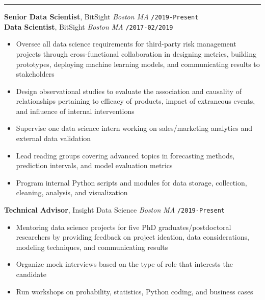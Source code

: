 \documentclass[10pt,english]{report}
\begin{document}
\vspace{5mm}

{\par}
\vspace{1mm}\hrule
\vspace{1mm}

\textbf{Senior Data Scientist}, BitSight \hfill \textit{Boston MA} \texttt{/2019-Present} \\
\textbf{Data Scientist}, BitSight \hfill \textit{Boston MA} \texttt{/2017-02/2019}
\begin{itemize}
\item Oversee all data science requirements for third-party risk management projects through cross-functional collaboration in designing metrics, building prototypes, deploying machine learning models, and communicating results to stakeholders
\item Design observational studies to evaluate the association and causality of relationships pertaining to efficacy of products, impact of extraneous events, and influence of internal interventions
\item Supervise one data science intern working on sales/marketing analytics and external data validation
\item Lead reading groups covering advanced topics in forecasting methods, prediction intervals, and model evaluation metrics
\item Program internal Python scripts and modules for data storage, collection, cleaning, analysis, and visualization
\end{itemize}

\vspace{1mm}

\textbf{Technical Advisor}, Insight Data Science \hfill \textit{Boston MA} \texttt{/2019-Present}
\begin{itemize}
\item Mentoring data science projects for five PhD graduates/postdoctoral researchers by providing feedback on project ideation, data considerations, modeling techniques, and communicating results
\item Organize mock interviews based on the type of role that interests the candidate
\item Run workshops on probability, statistics, Python coding, and business cases
\end{itemize}
\end{document}
